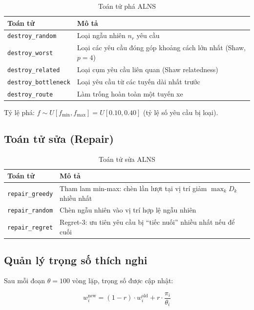\documentclass[12pt, a4paper]{article}
\begin{document}
\begin{table}[H]
\centering
\caption{Toán tử phá ALNS}
\begin{tabular}{lp{9cm}}
\toprule
\textbf{Toán tử} & \textbf{Mô tả} \\
\midrule
\texttt{destroy\_random}     & Loại ngẫu nhiên $n_r$ yêu cầu \\
\texttt{destroy\_worst}      & Loại các yêu cầu đóng góp khoảng cách lớn nhất (Shaw, $p=4$) \\
\texttt{destroy\_related}    & Loại cụm yêu cầu liên quan (Shaw relatedness) \\
\texttt{destroy\_bottleneck} & Loại yêu cầu từ các tuyến dài nhất trước \\
\texttt{destroy\_route}      & Làm trống hoàn toàn một tuyến xe \\
\bottomrule
\end{tabular}
\end{table}

Tỷ lệ phá: $f \sim U[f_{\min}, f_{\max}] = U[0.10, 0.40]$ (tỷ lệ số yêu cầu bị loại).

\subsection{Toán tử sửa (Repair)}

\begin{table}[H]
\centering
\caption{Toán tử sửa ALNS}
\begin{tabular}{lp{9cm}}
\toprule
\textbf{Toán tử} & \textbf{Mô tả} \\
\midrule
\texttt{repair\_greedy}  & Tham lam min-max: chèn lần lượt tại vị trí giảm $\max_k D_k$ nhiều nhất \\
\texttt{repair\_random}  & Chèn ngẫu nhiên vào vị trí hợp lệ ngẫu nhiên \\
\texttt{repair\_regret}  & Regret-3: ưu tiên yêu cầu bị ``tiếc nuối'' nhiều nhất nếu để cuối \\
\bottomrule
\end{tabular}
\end{table}

\subsection{Quản lý trọng số thích nghi}

Sau mỗi đoạn $\theta = 100$ vòng lặp, trọng số được cập nhật:

\begin{equation}
  w_i^{\text{new}} = (1 - r) \cdot w_i^{\text{old}} + r \cdot \frac{\pi_i}{\theta_i}
\end{equation}
\end{document}
